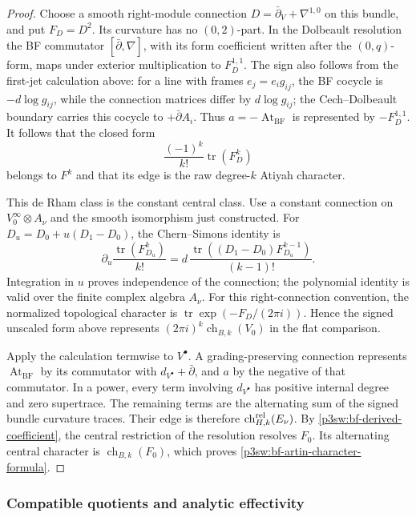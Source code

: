 \documentclass[11pt]{article}
\numberwithin{equation}{section}
\begin{document}
\begin{proof}
Choose a smooth right-module connection
\(D=\bar\partial_V+\nabla^{1,0}\) on this bundle, and put
\(F_D=D^2\).  Its curvature has no \((0,2)\)-part.  In the
Dolbeault resolution the BF commutator
\([\bar\partial,\nabla]\), with its form coefficient written
after the \((0,q)\)-form, maps under exterior multiplication to
\(F_D^{1,1}\).  The sign also follows from the first-jet
calculation above: for a line with frames \(e_j=e_i g_{ij}\),
the BF cocycle is \(-d\log g_{ij}\), while the connection
matrices differ by \(d\log g_{ij}\); the Cech--Dolbeault
boundary carries this cocycle to \(+\bar\partial A_i\).
Thus \(a=-\operatorname{At}_{\mathrm{BF}}\) is represented by
\(-F_D^{1,1}\).  It follows that the closed form
\[
 \frac{(-1)^k}{k!}\operatorname{tr}(F_D^k)
\]
belongs to \(F^k\) and that its edge is the raw degree-\(k\)
Atiyah character.

This de Rham class is the constant central class.  Use a constant
connection on \(V_0^\infty\otimes A_\nu\) and the smooth
isomorphism just constructed.  For
\(D_u=D_0+u(D_1-D_0)\), the Chern--Simons identity is
\[
 \partial_u\frac{\operatorname{tr}(F_{D_u}^k)}{k!}
 =d\,\frac{\operatorname{tr}((D_1-D_0)F_{D_u}^{k-1})}{(k-1)!}.
\]
Integration in \(u\) proves independence of the connection;
the polynomial identity is valid over the finite complex algebra
\(A_\nu\).  For this right-connection convention, the normalized
topological character is
\(\operatorname{tr}\exp(-F_D/(2\pi i))\).  Hence the signed
unscaled form above represents
\((2\pi i)^k\operatorname{ch}_{B,k}(V_0)\) in the flat comparison.

Apply the calculation termwise to \(V^\bullet\).  A
grading-preserving connection represents
\(\operatorname{At}_{\mathrm{BF}}\) by its commutator with
\(d_{V^\bullet}+\bar\partial\), and \(a\) by the negative of
that commutator.  In a power, every term involving
\(d_{V^\bullet}\) has positive internal degree and zero
supertrace.  The remaining terms are the alternating sum of the
signed bundle curvature traces.  Their edge is therefore
\(\operatorname{ch}^{\rm rel}_{H,k}(E_\nu)\).  By
\eqref{p3sw:bf-derived-coefficient}, the central restriction of
the resolution resolves \(F_0\).  Its alternating central
character is \(\operatorname{ch}_{B,k}(F_0)\), which proves
\eqref{p3sw:bf-artin-character-formula}.
\end{proof}

\subsubsection{Compatible quotients and analytic effectivity}
\end{document}

